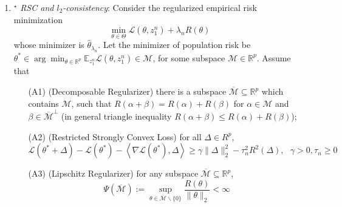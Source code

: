 \documentclass[11pt]{article}
\def\L{{\mathcal L}}
\def\M{{\mathcal M}}
\def\R{{\mathbb R}}
\def\E{{\mathbb E}}
\begin{document}
\begin{enumerate}
\item $^\star$ {\em RSC and $l_2$-consistency}: Consider the regularized empirical risk minimization
\[ \min_{\theta\in \Theta} \L( \theta, z_1^n) + \lambda_n R(\theta) \]
whose minimizer is $\hat{\theta}_{\lambda_n}$. Let the minimizer of population risk be $\theta^\ast \in \arg\min_{\theta \in \R^p} \E_{z_1^n} \L( \theta, z_1^n) \in \M$, for some subspace $\M\in \R^p$. Assume that
\begin{itemize}
\item[(A1)] (Decomposable Regularizer) there is a subspace $\overline{\M} \subseteq \R^p$ which contains $\M$, such that $R(\alpha + \beta) = R(\alpha) + R(\beta)$ for $\alpha\in \M$ and $\beta\in \overline{\M}^\perp$ (in general triangle inequality $R(\alpha+\beta)\leq R(\alpha)+R(\beta)$);
\item[(A2)] (Restricted Strongly Convex Loss) for all $\Delta \in R^p$,
\[ \L(\theta^\ast + \Delta) - \L(\theta^\ast) - \left< \nabla \L(\theta^\ast), \Delta \right> \geq \gamma \|\Delta\|_2^2 - \tau_n^2 R^2(\Delta), \ \ \ \gamma>0, \tau_n \geq 0 \]
\item[(A3)] (Lipschitz Regularizer) for any subspace $\overline{\M}\subseteq \R^p$,
\[   \Psi(\overline{\M}) := \sup_{\theta \in \overline{\M}\backslash \{0\}} \frac{R(\theta)} {\|\theta\|_2} <\infty \]
 \end{itemize}


\end{enumerate}
\end{document}
